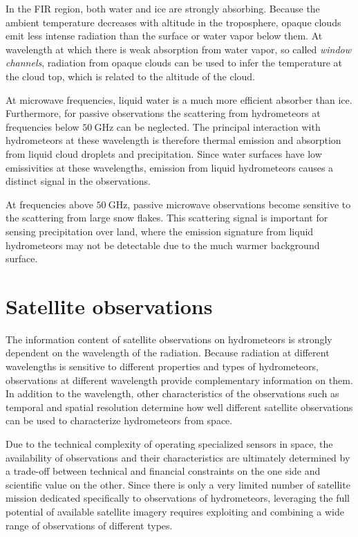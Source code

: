 In the FIR region, both water and ice are strongly absorbing. Because the
ambient temperature decreases with altitude in the troposphere, opaque clouds
emit less intense radiation than the surface or water vapor below them.
At wavelength at which there is weak absorption from water vapor, so called
\textit{window channels}, radiation from opaque clouds can be used to
infer the temperature at the cloud top, which is related to the altitude of
the cloud.

At microwave frequencies, liquid water is a much more efficient absorber than
ice. Furthermore, for passive observations the scattering from hydrometeors at
frequencies below $\SI{50}{\giga \hertz}$ can be neglected. The principal
interaction with hydrometeors at these wavelength is therefore thermal emission
and absorption from liquid cloud droplets and precipitation. Since water
surfaces have low emissivities at these wavelengths, emission from liquid
hydrometeors causes a distinct signal in the observations.

At frequencies above $\SI{50}{\giga \hertz}$, passive microwave observations
become sensitive to the scattering from large snow flakes. This scattering
signal is important for sensing precipitation over land, where the emission
signature from liquid hydrometeors may not be detectable due to the much warmer
background surface.

\section{Satellite observations}

The information content of satellite observations on hydrometeors is strongly
dependent on the wavelength of the radiation. Because radiation at different
wavelengths is sensitive to different properties and types of hydrometeors, 
observations at different wavelength provide complementary information on
them. In addition to the wavelength, other characteristics of the observations
such as temporal and spatial resolution determine how well different satellite
observations can be used to characterize hydrometeors from space.

Due to the technical complexity of operating specialized sensors in space, the
availability of observations and their characteristics are ultimately determined
by a trade-off between technical and financial constraints on the one side and
scientific value on the other. Since there is only a very limited number of
satellite mission dedicated specifically to observations of hydrometeors,
leveraging the full potential of available satellite imagery requires exploiting
and combining a wide range of observations of different types.

